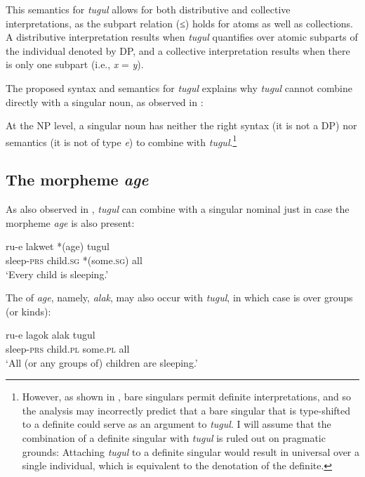 \documentclass[output=paper,newtxmath,modfonts,nonflat,hidelinks]{langsci/langscibook}
\begin{document}
\noindent This semantics for \textit{tugul} allows for both distributive and collective interpretations, as the subpart relation (≤) holds for atoms as well as collections. A distributive interpretation results when \textit{tugul} quantifies over atomic subparts of the individual denoted by DP, and a collective interpretation results when there is only one subpart (i.e., \textit{x} = \textit{y}). 

The proposed syntax and semantics for \textit{tugul} explains why \textit{tugul} cannot combine directly with a singular noun, as observed in :

\z

\noindent At the NP level, a singular noun has neither the right syntax (it is not a DP) nor semantics (it is not of type \textit{e}) to combine with \textit{tugul}.\footnote{However, as shown in , bare singulars permit definite interpretations, and so the analysis may incorrectly predict that a bare singular that is type-shifted to a definite could serve as an argument to \textit{tugul}. I will assume that the combination of a definite singular with \textit{tugul} is ruled out on pragmatic grounds: Attaching \textit{tugul} to a definite singular would result in universal  over a single individual, which is equivalent to the denotation of the definite.}   

\subsection{The morpheme \textit{age}}
As also observed in , \textit{tugul} can combine with a singular nominal just in case the morpheme \textit{age} is also present:

\ea \label{ex:landman:agetugul}
\gll ru-e lakwet *(age) tugul\\
       sleep-\textsc{prs} child.\textsc{sg} *(some.\textsc{sg}) all\\
  \glt ‘Every child is sleeping.’
\z

\noindent The  of \textit{age}, namely, \textit{alak}, may also occur with \textit{tugul}, in which case  is over groups (or kinds):

\ea \label{ex:landman:alaktugul}
\gll ru-e lagok alak tugul\\
       sleep-\textsc{prs} child.\textsc{pl} some.\textsc{pl} all\\
  \glt ‘All (or any groups of) children are sleeping.’
\z
 
\end{document}
